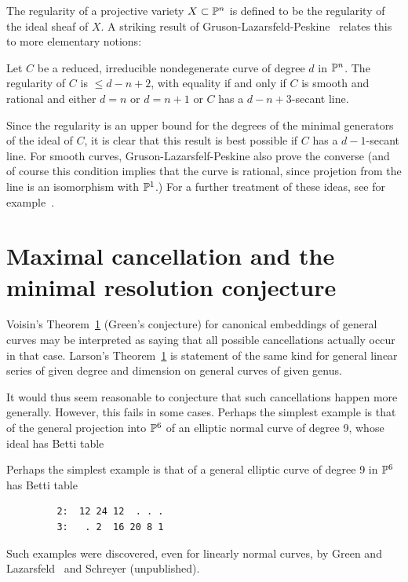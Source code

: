The regularity of a projective variety $X\subset {\mathbb P}^{n}$ is  defined to be the regularity of the ideal sheaf of $X$. A striking result of Gruson-Lazarsfeld-Peskine~\cite{} relates this to more elementary notions:

\begin{theorem}\label{GLP}
 Let $C$ be a reduced, irreducible nondegenerate curve of degree $d$ in ${\mathbb P}^{n}$. The regularity of $C$ is $\leq d-n+2$, with equality if and only if $C$ is smooth and rational and either $d=n$ or $d=n+1$ or $C$ has a $d-n+3$-secant line. 
 \end{theorem}
 
Since the regularity is an upper bound for the degrees of the minimal generators of the ideal of $C$, it is clear that this result is best possible if $C$ has a $d-1$-secant line. For smooth curves, Gruson-Lazarsfelf-Peskine also prove the converse (and of course this condition implies that the curve is rational, since projetion from the line is an isomorphism with ${\mathbb P}^{1}$.)
For a further treatment of these ideas, see for example~\cite{geomsyz}.



\section{Maximal cancellation and the minimal resolution conjecture}
Voisin's Theorem~\ref{} (Green's conjecture) for canonical embeddings of general curves may be interpreted
as saying that all possible cancellations actually occur in that case. Larson's Theorem~\ref{}
 is  statement of the same kind for general linear series of
given degree and dimension on general curves of given genus. 

It would thus seem reasonable to conjecture that such cancellations happen more generally. However, this fails in some cases. Perhaps the simplest example is that of the general projection into ${\mathbb P}^{6}$ of
an elliptic normal curve of degree 9, whose ideal has Betti table

Perhaps the simplest example is that of a general elliptic curve of degree 9 in ${\mathbb P}^{6}$
has Betti table
\begin{verbatim}
         2:  12 24 12  . . .
         3:   . 2  16 20 8 1
\end{verbatim}
Such examples were discovered, even for linearly normal curves, by Green and Lazarsfeld~\cite{ M. GREEN and R. LAZARSFELD, Some results on the syzygies of finite sets and algebraiccurves,CompositioMath.67(1988),301?314.MR90d:14034 381, 391, 392} and Schreyer (unpublished). 

